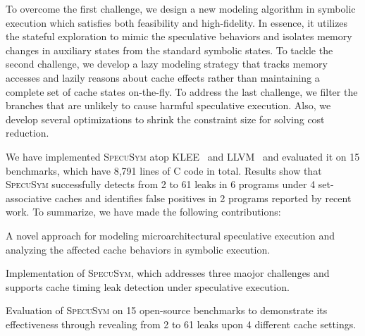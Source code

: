 \documentclass[sigconf]{acmart}
\newcommand\ignore[1]{}
\newcommand{\SpecuSym}{\textsc{SpecuSym} }
\begin{document}
To overcome the first challenge, we design a new modeling algorithm in symbolic 
execution which satisfies both feasibility and high-fidelity. In essence, it 
utilizes the stateful exploration to mimic the speculative behaviors and isolates 
memory changes in auxiliary states from the standard symbolic states. 
%
To tackle the second challenge, we develop a lazy modeling strategy that tracks 
memory accesses and lazily reasons about cache effects rather than maintaining a 
complete set of cache states on-the-fly. 
%
To address the last challenge, we filter the branches that are unlikely to cause 
harmful speculative execution. Also, we develop several optimizations to shrink 
the constraint size for solving cost reduction.



\ignore{
Also, We develop a merging schema between the mimicked states and regular symbolic 
states to accumulate the cache side effects.

In general, we decompose the precise but lengthy constraint into smaller chunks 
without losing correctness, as well as utilizing executor kernel characteristics 
for faster computation.

However, the side effects caused by speculative execution are normally undetectable 
under standard symbolic execution. To overcome this problem, we introduce the 
$\mathit{speculative~modeling}$ into symbolic execution. Thus, cache side effects 
are visible and cache timing leaks from speculative execution detectable now. 
}


We have implemented \SpecuSym atop KLEE~\cite{CadarDE08} and LLVM~\cite{LattnerA04} 
and evaluated it on 15 benchmarks, which have 8,791 lines of C code in total. Results 
show that \SpecuSym successfully detects from 2 to 61 leaks in 6 programs under 4 
set-associative caches and identifies false positives in 2 programs reported by recent 
work. To summarize, we have made the following contributions:

\begin{compactitem}
  \item 
    A novel approach for modeling microarchitectural speculative execution and 
		analyzing the affected cache behaviors in symbolic execution.
  \item 
		Implementation of \textsc{SpecuSym}, which addresses three maojor challenges
		and supports cache timing leak detection under speculative execution. 
  \item 
    Evaluation of \SpecuSym on 15 open-source benchmarks to demonstrate its 
    effectiveness through revealing from 2 to 61 leaks upon 4 different 
		cache settings.
\end{compactitem}
\end{document}
